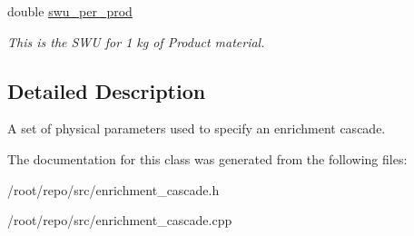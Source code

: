 \begin{DoxyCompactItemize}
\mbox{\label{classpyne_1_1enrichment_1_1_cascade_aaa665cb5f6c5616ce39fe392c428a323}} 
double \hyperlink{classpyne_1_1enrichment_1_1_cascade_aaa665cb5f6c5616ce39fe392c428a323}{swu\+\_\+per\+\_\+prod}
\begin{DoxyCompactList}\small\item\em This is the S\+WU for 1 kg of Product material. \end{DoxyCompactList}\end{DoxyCompactItemize}


\subsection{Detailed Description}
A set of physical parameters used to specify an enrichment cascade. 

The documentation for this class was generated from the following files\+:\begin{DoxyCompactItemize}
\item 
/root/repo/src/enrichment\+\_\+cascade.\+h\item 
/root/repo/src/enrichment\+\_\+cascade.\+cpp\end{DoxyCompactItemize}
